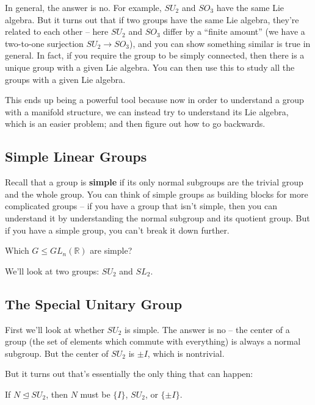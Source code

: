 \begin{ans}
    In general, the answer is no. For example, $SU_2$ and $SO_3$ have the same Lie algebra. But it turns out that if two groups have the same Lie algebra, they're related to each other -- here $SU_2$ and $SO_3$ differ by a ``finite amount'' (we have a two-to-one surjection $SU_2 \to SO_3$), and you can show something similar is true in general. In fact, if you require the group to be simply connected, then there is a unique group with a given Lie algebra. You can then use this to study all the groups with a given Lie algebra. 
\end{ans}

This ends up being a powerful tool because now in order to understand a group with a manifold structure, we can instead try to understand its Lie algebra, which is an easier problem; and then figure out how to go backwards. 

\subsection{Simple Linear Groups}

Recall that a group is \textbf{simple} if its only normal subgroups are the trivial group and the whole group. You can think of simple groups as building blocks for more complicated groups -- if you have a group that isn't simple, then you can understand it by understanding the normal subgroup and its quotient group. But if you have a simple group, you can't break it down further. 

\begin{qq}
Which $G \leq GL_n(\mathbb{R})$ are simple?
\end{qq}

We'll look at two groups: $SU_2$ and $SL_2$. 

\subsection{The Special Unitary Group}

First we'll look at whether $SU_2$ is simple. The answer is no -- the center of a group (the set of elements which commute with everything) is always a normal subgroup. But the center of $SU_2$ is $\pm I$, which is nontrivial. 

But it turns out that's essentially the only thing that can happen: 

\begin{theorem}\label{su2normal}
    If $N \trianglelefteq SU_2$, then $N$ must be $\{I\}$, $SU_2$, or $\{\pm I\}$.
\end{theorem}

